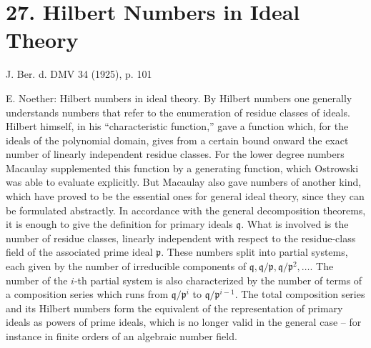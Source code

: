 \section*{27. Hilbert Numbers in Ideal Theory}

\begin{center}
J. Ber. d. DMV 34 (1925), p. 101
\end{center}

E. Noether: Hilbert numbers in ideal theory. By Hilbert numbers one generally understands numbers that refer to the enumeration of residue classes of ideals. Hilbert himself, in his ``characteristic function,'' gave a function which, for the ideals of the polynomial domain, gives from a certain bound onward the exact number of linearly independent residue classes. For the lower degree numbers Macaulay supplemented this function by a generating function, which Ostrowski was able to evaluate explicitly. But Macaulay also gave numbers of another kind, which have proved to be the essential ones for general ideal theory, since they can be formulated abstractly. In accordance with the general decomposition theorems, it is enough to give the definition for primary ideals $\mathfrak q$. What is involved is the number of residue classes, linearly independent with respect to the residue-class field of the associated prime ideal $\mathfrak p$. These numbers split into partial systems, each given by the number of irreducible components of $\mathfrak q,\mathfrak q/\mathfrak p,\mathfrak q/\mathfrak p^2,\ldots$. The number of the $i$-th partial system is also characterized by the number of terms of a composition series which runs from $\mathfrak q/\mathfrak p^i$ to $\mathfrak q/\mathfrak p^{i-1}$. The total composition series and its Hilbert numbers form the equivalent of the representation of primary ideals as powers of prime ideals, which is no longer valid in the general case -- for instance in finite orders of an algebraic number field.
